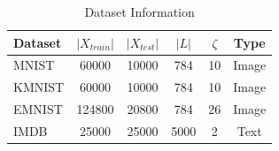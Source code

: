 \begin{table}
	\centering
	\caption{Dataset Information}
	\label{tab:dataset-size}
	\begin{tabular}{lccccc}
		\hline
		Dataset & $|X_{train}|$ & $|X_{test}|$ & $|L|$ & $\zeta$ & Type \\
		\hline
		MNIST & 60000 & 10000 & 784 & 10 & Image \\
		KMNIST & 60000 & 10000 & 784 & 10 & Image \\
		EMNIST & 124800 & 20800 & 784 & 26 & Image \\
		IMDB & 25000 & 25000 & 5000 & 2 & Text \\
		\hline
	\end{tabular}
\end{table}